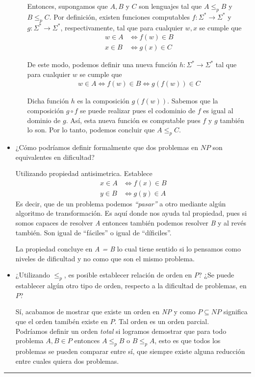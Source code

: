 \documentclass[12pt,letterpaper]{article}
\newcommand{\lineaxd}{{\color{brown}\rule{\linewidth}{0.5mm}}}
\begin{document}
\begin{itemize}
\begin{itemize}
        Entonces, supongamos que $A, B$ y $C$ son lenguajes tal que $A \leq_p B$ 
        y $B \leq_p C$. Por definición, existen funciones computables 
        $f: \Sigma^* \rightarrow \Sigma^*$ y $g: \Sigma^* \rightarrow \Sigma^*$, 
        respectivamente, tal que para cualquier $w,x$ se cumple que 
        \begin{align*}
            w \in A &\Leftrightarrow f(w) \in B \\ 
            x \in B &\Leftrightarrow g(x) \in C
        \end{align*} 

        De este modo, podemos definir una nueva función $h: \Sigma^* \rightarrow 
        \Sigma^*$ tal que para cualquier $w$ se cumple que
        \begin{align*}
            w \in A \Leftrightarrow f(w) \in B \Leftrightarrow g(f(w)) \in C
        \end{align*}

        Dicha función $h$ es la composición $g(f(w))$. Sabemos que la composición $g \circ f$ se puede realizar pues el 
        codominio de $f$ es igual al dominio de $g$. Así, esta nueva función 
        es computable pues $f$ y $g$ también lo son. Por lo tanto, podemos 
        concluir que $A \leq_p C$.
    \end{itemize}

    \item ¿Cómo podríamos definir formalmente que dos problemas en $NP$ son equivalentes en dificultad?
    
    Utilizando propiedad antisimetrica. Establece     
    \begin{align*}
        x \in A &\Leftrightarrow f(x) \in B \\ 
        y \in B &\Leftrightarrow g(y) \in A
    \end{align*} 
    Es decir, que de un problema podemos \textit{``pasar''} a otro mediante algún algoritmo de transformación. Es aquí donde nos ayuda tal propiedad, pues si somos capaces de resolver \textit{A} entonces también podemos resolver \textit{B} y al revés también. Son igual de ``fáciles'' o igual de ``díficiles''.
    
    La propiedad concluye en \textit{A = B} lo cual tiene sentido si lo pensamos como niveles de dificultad y no como que son el mismo problema.
    
    \item ¿Utilizando $\leq_p$, es posible establecer relación de orden en $P$? ¿Se puede establecer algún otro tipo de orden, respecto a la dificultad de problemas, en $P$?
    
    Sí, acabamos de mostrar que existe un orden en \textit{NP} y como $P \subseteq NP$ significa que el orden tamibén existe en $P$. Tal orden es un orden parcial.\\
    Podríamos definir un orden \textit{total} si logramos demostrar que para todo problema $A, B \in P$ entonces $A \leq_p B$ o $B \leq_p A$, esto es que todos los problemas se pueden comparar entre sí, que siempre existe alguna reducción entre cuales quiera dos problemas.
    
    
    
\end{itemize}
\lineaxd
\end{document}

